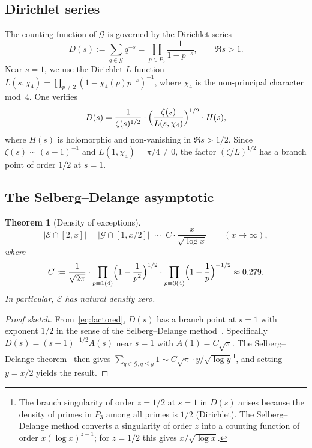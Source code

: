 \documentclass[12pt]{amsart}
\theoremstyle{bluehead}
\newtheorem{theorem}{Theorem}[section]
\theoremstyle{orangehead}
\theoremstyle{greenhead}
\newcommand{\Exc}{\mathcal{E}}
\newcommand{\Gauss}{\mathcal{G}}
\begin{document}
\subsection{Dirichlet series}

The counting function of $\Gauss$ is governed by the Dirichlet series
\begin{equation}\label{eq:DS}
  D(s):=\sum_{q\in\Gauss}q^{-s}
  =\prod_{p\in P_3}\frac{1}{1-p^{-s}},
  \qquad\Re s>1.
\end{equation}
Near $s=1$, we use the Dirichlet $L$-function
$L(s,\chi_4)=\prod_{p\ne2}(1-\chi_4(p)p^{-s})^{-1}$,
where $\chi_4$ is the non-principal character mod~$4$.
One verifies
\begin{equation}\label{eq:factored}
  D(s)=\frac{1}{\zeta(s)^{1/2}}\cdot
  \Bigl(\frac{\zeta(s)}{L(s,\chi_4)}\Bigr)^{1/2}
  \cdot H(s),
\end{equation}
where $H(s)$ is holomorphic and non-vanishing in $\Re s>1/2$.
Since $\zeta(s)\sim(s-1)^{-1}$ and $L(1,\chi_4)=\pi/4\ne0$, the
factor $(\zeta/L)^{1/2}$ has a branch point of order $1/2$ at $s=1$.

\subsection{The Selberg--Delange asymptotic}

\begin{theorem}[Density of exceptions]\label{thm:dens}
  \[
    |\Exc\cap[2,x]|=\bigl|\Gauss\cap[1,x/2]\bigr|
    \;\sim\; C\cdot\frac{x}{\sqrt{\log x}}
    \qquad(x\to\infty),
  \]
  where
  \begin{equation}\label{eq:C}
    C:=\frac{1}{\sqrt{2\pi}}\cdot
    \prod_{p\equiv1(4)}\Bigl(1-\frac{1}{p^2}\Bigr)^{1/2}
    \cdot
    \prod_{p\equiv3(4)}\Bigl(1-\frac{1}{p}\Bigr)^{-1/2}
    \approx 0.279.
  \end{equation}
  In particular, $\Exc$ has natural density zero.
\end{theorem}

\begin{proof}[Proof sketch]
  From~\eqref{eq:factored}, $D(s)$ has a branch point at $s=1$
  with exponent $1/2$ in the sense of the Selberg--Delange
  method~\cite{tenenbaum1995}.
  Specifically $D(s)=(s-1)^{-1/2}A(s)$ near $s=1$ with $A(1)=C\sqrt{\pi}$.
  The Selberg--Delange theorem~\cite[Ch.~II.5]{tenenbaum1995} then gives
  $\sum_{q\in\Gauss,q\le y}1\sim C\sqrt{\pi}\cdot y/\!\sqrt{\log y}$\footnote{%
    The branch singularity of order $z=1/2$ at $s=1$ in $D(s)$
    arises because the density of primes in $P_3$ among all primes is
    $1/2$ (Dirichlet).  The Selberg--Delange method converts a
    singularity of order $z$ into a counting function of order
    $x(\log x)^{z-1}$; for $z=1/2$ this gives $x/\sqrt{\log x}$.},
  and setting $y=x/2$ yields the result.
\qedhere
\end{proof}
\end{document}
